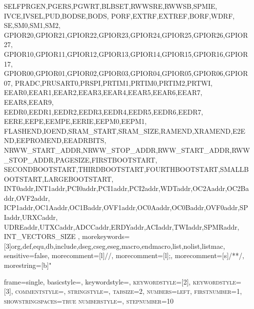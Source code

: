 {{				SELFPRGEN,PGERS,PGWRT,BLBSET,RWWSRE,RWWSB,SPMIE,
				IVCE,IVSEL,PUD,BODSE,BODS,
				PORF,EXTRF,EXTREF,BORF,WDRF,
				SE,SM0,SM1,SM2,
				GPIOR20,GPIOR21,GPIOR22,GPIOR23,GPIOR24,GPIOR25,GPIOR26,GPIOR27,
				GPIOR10,GPIOR11,GPIOR12,GPIOR13,GPIOR14,GPIOR15,GPIOR16,GPIOR17,
				GPIOR00,GPIOR01,GPIOR02,GPIOR03,GPIOR04,GPIOR05,GPIOR06,GPIOR07,
				PRADC,PRUSART0,PRSPI,PRTIM1,PRTIM0,PRTIM2,PRTWI,
				EEAR0,EEAR1,EEAR2,EEAR3,EEAR4,EEAR5,EEAR6,EEAR7,
				EEAR8,EEAR9,
				EEDR0,EEDR1,EEDR2,EEDR3,EEDR4,EEDR5,EEDR6,EEDR7,
				EERE,EEPE,EEMPE,EERIE,EEPM0,EEPM1,
				FLASHEND,IOEND,SRAM_START,SRAM_SIZE,RAMEND,XRAMEND,E2END,EEPROMEND,EEADRBITS,
				NRWW_START_ADDR,NRWW_STOP_ADDR,RWW_START_ADDR,RWW_STOP_ADDR,PAGESIZE,FIRSTBOOTSTART,
    			SECONDBOOTSTART,THIRDBOOTSTART,FOURTHBOOTSTART,SMALLBOOTSTART,LARGEBOOTSTART,
				INT0addr,INT1addr,PCI0addr,PCI1addr,PCI2addr,WDTaddr,OC2Aaddr,OC2Baddr,OVF2addr,
				ICP1addr,OC1Aaddr,OC1Baddr,OVF1addr,OC0Aaddr,OC0Baddr,OVF0addr,SPIaddr,URXCaddr,
				UDREaddr,UTXCaddr,ADCCaddr,ERDYaddr,ACIaddr,TWIaddr,SPMRaddr,
				INT_VECTORS_SIZE
},%
 morekeywords=[3]{org,def,equ,db,include,dseg,cseg,eseg,macro,endmacro,list,nolist,listmac},%
    sensitive=false, %
    morecomment=[l]{//}, %
    morecomment=[l]{;}, %
    morecomment=[s]{/*}{*/}, %
    morestring=[b]" %
} %




{
	frame=single, %
	basicstyle=\small\ttfamily, %
	keywordstyle=\scshape\color{Blue}, %
	keywordstyle=[2]\color{Orange}, %
	keywordstyle=[3]\color{Purple}, %
	commentstyle=\color{MyDarkGreen}\small,
	stringstyle=\color{Red},
	tabsize=2, %
	numbers=left, %
	firstnumber=1, %
	showstringspaces=true
	numberstyle=\tiny\color{Blue}, %
	stepnumber=10 %
}


